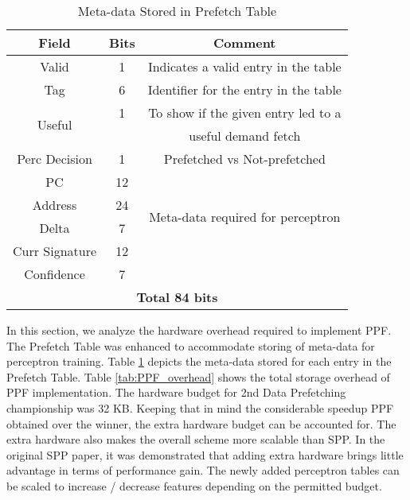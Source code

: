 
\begin{table}[ht]
    \centering
    \begin{tabular}{|c|c|c|}
    \hline
        \textbf{Field} &
        \textbf{Bits} &
        \textbf{Comment} \\
    \hline
         Valid 		& 1  & Indicates a valid entry in the table\\
         Tag 		& 6  & Identifier for the entry in the table\\
         \multirow{2}{1cm}{Useful} 	& 1  & To show if the given entry led to a\\
                    	&    & useful demand fetch\\
         Perc Decision 	& 1  & Prefetched vs Not-prefetched \\
    \hline
        PC 		& 12 & \multirow{4}{4.8cm}{Meta-data required for perceptron}\\
        Address 	& 24 & \multirow{4}{1.1cm}{training}\\
        Delta 		& 7  & \\
        Curr Signature 	& 12 & \\
        Confidence 	& 7  & \\
    \hline
        \multicolumn{3}{|c|}{\textbf{Total 84 bits}}\\
    \hline
    \end{tabular}
    \caption{Meta-data Stored in Prefetch Table}
    \label{tab:PTable_metadata}
\end{table}


In this section, we analyze the hardware overhead required to
implement PPF.  The Prefetch Table was enhanced to accommodate
storing of meta-data for perceptron training.  Table
\ref{tab:PTable_metadata} depicts the meta-data stored for each entry in
the Prefetch Table.  Table \ref{tab:PPF_overhead} shows the total
storage overhead of PPF implementation.  The hardware budget for
2nd Data Prefetching championship was 32 KB.  Keeping that in mind 
the considerable speedup PPF obtained over the winner, the extra hardware
budget can be accounted for.  The extra hardware also makes the
overall scheme more scalable than SPP.  In the original SPP paper, it
was demonstrated that adding extra hardware brings little advantage in
terms of performance gain.  The newly added perceptron tables can be
scaled to increase / decrease features depending on the permitted
budget.

